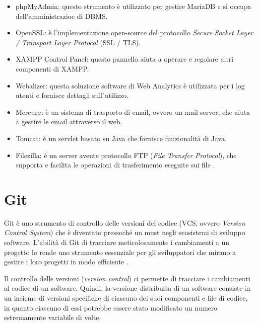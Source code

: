 \begin{itemize}
    \item phpMyAdmin: questo strumento è utilizzato per gestire MariaDB e si occupa dell'amministrazioe di DBMS.
    \item OpenSSL: è l'implementazione open-source del protocollo \textit{Secure Socket Layer / Transport Layer Protocol} (SSL / TLS).
    \item XAMPP Control Panel: questo pannello aiuta a operare e regolare altri componenti di XAMPP.
    \item Webalizer: questa soluzione software di Web Analytics è utilizzata per i log utenti e fornisce dettagli sull'utilizzo.
    \item Mercury: è un sistema di trasporto di email, ovvero un mail server, che aiuta a gestire le email attraverso il web.
    \item Tomcat: è un servlet basato su Java che fornisce funzionalità di Java.
    \item Filezilla: è un server avente protocollo FTP (\textit{File Transfer Protocol}), che supporta e facilita le operazioni di trasferimento eseguite sui file \cite{XAMPP}.
\end{itemize}


\section{Git}
Git è uno strumento di controllo delle versioni del codice (VCS, ovvero \textit{Version Control System}) che è diventato pressoché un must negli ecosistemi di sviluppo software. L'abilità di Git di tracciare meticolosamente i cambiamenti a un progetto lo rende uno strumento essenziale per gli sviluppatori che mirano a gestire i loro progetti in modo efficiente \cite{Git, Git_Docs}.

Il controllo delle versioni (\textit{version control}) ci permette di tracciare i cambiamenti al codice di un software. Quindi, la versione distribuita di un software consiste in un insieme di versioni specifiche di ciascuno dei suoi componenti e file di codice, in quanto ciascuno di essi potrebbe essere stato modificato un numero estremamente variabile di volte.

